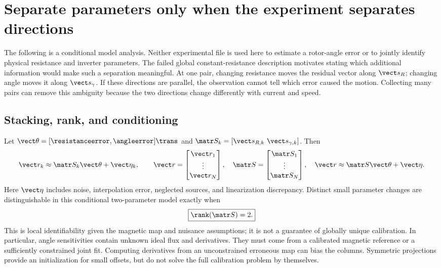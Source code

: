 \section{Separate parameters only when the experiment separates directions}
\label{sec:identification}
The following is a conditional model analysis. Neither experimental file
is used here to estimate a rotor-angle error or to jointly identify physical
resistance and inverter parameters. The failed global constant-resistance
description motivates stating which additional information would make such
a separation meaningful.
At one pair, changing resistance moves the residual vector along
$\vect s_R$; changing angle moves it along $\vect s_\gamma$. If these
directions are parallel, the observation cannot tell which error caused the
motion. Collecting many pairs can remove this ambiguity because the two
directions change differently with current and speed.

\subsection{Stacking, rank, and conditioning}
Let $\vect\theta=[\resistanceerror,\angleerror]\trans$ and
$\matr S_k=[\vect s_{R,k}\ \vect s_{\gamma,k}]$. Then
\begin{equation}
 \vect r_k\approx\matr S_k\vect\theta+\vect\eta_k,\qquad
 \vect r=\begin{bmatrix}\vect r_1\\\vdots\\\vect r_N\end{bmatrix},\quad
 \matr S=\begin{bmatrix}\matr S_1\\\vdots\\\matr S_N\end{bmatrix},
 \quad\vect r\approx\matr S\vect\theta+\vect\eta.
 \label{eq:stacked}
\end{equation}
Here $\vect\eta$ includes noise, interpolation error, neglected sources, and
linearization discrepancy. Distinct small parameter changes are distinguishable
in this conditional two-parameter model exactly when
\begin{equation}
 \boxed{\rank(\matr S)=2.}\label{eq:rank-condition}
\end{equation}
This is local identifiability given the magnetic map and nuisance assumptions;
it is not a guarantee of globally unique calibration. In particular, angle
sensitivities contain unknown ideal flux and derivatives. They must come from
a calibrated magnetic reference or a sufficiently constrained joint fit.
Computing derivatives from an unconstrained erroneous map can bias the columns.
Symmetric projections provide an initialization for small offsets, but do not
solve the full calibration problem by themselves.

